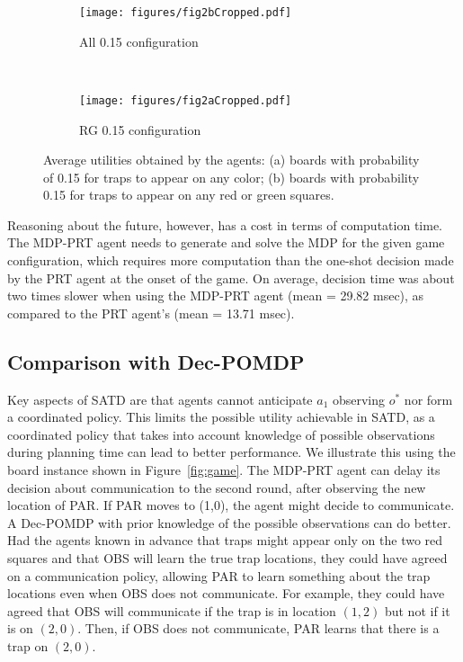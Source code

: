   
  \begin{figure}[h]
          \centering
          \begin{subfigure}[b]{0.25\textwidth}
                  \centering
                  \texttt{[image: figures/fig2bCropped.pdf]}
                  \caption{All 0.15 configuration}
                  \label{fig:all}
          \end{subfigure}%
          ~ %
          \begin{subfigure}[b]{0.25\textwidth}
                  \centering
                  \texttt{[image: figures/fig2aCropped.pdf]}
                  \caption{RG 0.15 configuration }
                  \label{fig:r}
          \end{subfigure}

          \caption{Average utilities obtained by the agents: (a) boards with probability of 0.15 for traps to appear on any color; (b) boards with probability 0.15 for traps to appear on any red or green squares.}
          \label{fig:util}
            \vspace{-0.3cm}
  \end{figure}
  

  
  Reasoning about the future, however, has a cost in terms of computation time. The MDP-PRT agent needs to generate and solve the MDP for the given game configuration, which requires more computation than the one-shot decision made by the PRT agent at the onset of the game. On average, decision time was about two times slower when using the MDP-PRT agent (mean = 29.82 msec), as compared to the PRT agent's (mean = 13.71 msec). 

  
  \subsection{Comparison with Dec-POMDP}
Key aspects of SATD are that agents cannot anticipate $a_1$ observing $o^*$ nor form a coordinated policy. This limits the possible utility achievable in SATD, as a coordinated policy that takes into account knowledge of possible observations during planning time can lead to better performance.
  We illustrate this using the board instance shown in Figure~\ref{fig:game}. The MDP-PRT agent can delay its decision about communication to the second round, after observing the new location of PAR. If  PAR moves to (1,0), the agent might decide to communicate. 
A Dec-POMDP with prior knowledge of the possible observations can do better. Had the agents known in advance that traps might appear only on the two red squares and that OBS will learn the true trap locations, they could have agreed on a communication policy, allowing  PAR to learn something about the trap locations even when  OBS does not communicate. For example, they could have agreed that OBS will communicate if the trap is in location $(1,2)$ but not if it is on $(2,0)$. Then, if OBS does not communicate, PAR learns that there is a trap on $(2,0)$.  


